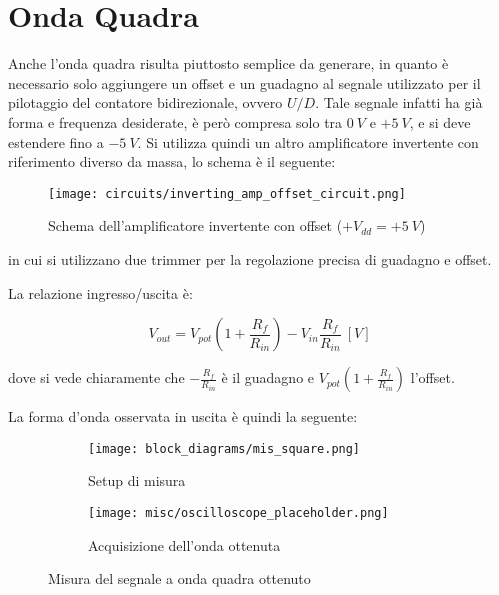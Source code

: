 
\section{Onda Quadra}


Anche l'onda quadra risulta piuttosto semplice da generare, in quanto è necessario solo
aggiungere un offset e un guadagno al segnale utilizzato per il pilotaggio del contatore
bidirezionale, ovvero $U/D$. Tale segnale infatti ha già forma e frequenza desiderate, è però
compresa solo tra $0\ V$ e $+5\ V$, e si deve estendere fino a $-5\ V$.
Si utilizza quindi un altro amplificatore invertente con riferimento diverso da massa, lo
schema è il seguente:

\begin{figure}[H]
    \centering
    \texttt{[image: circuits/inverting\_amp\_offset\_circuit.png]}
    \caption{Schema dell'amplificatore invertente con offset ($+V_{dd}=+5\ V$)}
    \label{inverting_amp_offset_circuit}
\end{figure}

in cui si utilizzano due trimmer per la regolazione precisa di guadagno e offset.

La relazione ingresso/uscita è:

\begin{equation}
    V_{out}=V_{pot}\left(1+\frac{R_f}{R_{in}}\right)-V_{in}\frac{R_f}{R_{in}}\ [V]
\end{equation}

dove si vede chiaramente che $-\frac{R_f}{R_{in}}$ è il guadagno e $V_{pot}\left(1+\frac{R_f}{R_{in}}\right)$
l'offset.

La forma d'onda osservata in uscita è quindi la seguente:

\begin{figure}[H]
    \centering

    \begin{subfigure}{.5\textwidth}
        \centering
        \texttt{[image: block\_diagrams/mis\_square.png]}
        \caption{Setup di misura}
        \label{mis_square}
    \end{subfigure}%
    \begin{subfigure}{.5\textwidth}
        \centering
        \texttt{[image: misc/oscilloscope\_placeholder.png]}
        \caption{Acquisizione dell'onda ottenuta}
        \label{acq_square}
    \end{subfigure}

    \caption{Misura del segnale a onda quadra ottenuto}
\end{figure}

